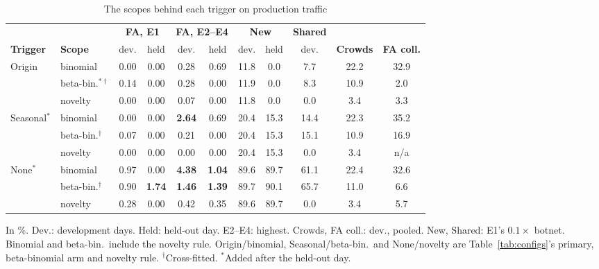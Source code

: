 \documentclass[conference,letterpaper,10pt]{IEEEtran}
\newcommand\1{\textit{(i)}}
\newcommand\2{\textit{(ii)}}
\newcommand\3{\textit{(iii)}}
\newcommand\4{\textit{(iv)}}
\newcommand\5{\textit{(v)}}
\newcommand\6{\textit{(vi)}}
\newcommand\7{\textit{(vii)}}
\newcommand\8{\textit{(viii)}}
\newcommand\9{\textit{(ix)}}
\begin{document}
\begin{table}[!ht]
\centering
\caption{The scopes behind each trigger on production traffic}
\label{tab:triggers}
\scriptsize
\setlength{\tabcolsep}{1.8pt}
\begin{tabular}{@{}llccccccccc@{}}
\toprule
 & & \multicolumn{2}{c}{\textbf{FA, E1}} & \multicolumn{2}{c}{\textbf{FA, E2--E4}} & \multicolumn{2}{c}{\textbf{New}} & \textbf{Shared} & & \\
\cmidrule(lr){3-4}\cmidrule(lr){5-6}\cmidrule(lr){7-8}\cmidrule(lr){9-9}
\textbf{Trigger} & \textbf{Scope} & dev. & held & dev. & held & dev. & held & dev. & \textbf{Crowds} & \textbf{FA coll.} \\
\midrule
Origin              & binomial               & 0.00 & 0.00 & 0.28 & 0.69 & 11.8 & 0.0  & 7.7  & 22.2 & 32.9 \\
                    & beta-bin.$^{*\dagger}$ & 0.14 & 0.00 & 0.28 & 0.00 & 11.9 & 0.0  & 8.3  & 10.9 & 2.0 \\
                    & novelty                & 0.00 & 0.00 & 0.07 & 0.00 & 11.8 & 0.0  & 0.0  & 3.4  & 3.3 \\
\rowcolor[gray]{0.90}
Seasonal$^{*}$      & binomial               & 0.00 & 0.00 & \textbf{2.64} & 0.69 & 20.4 & 15.3 & 14.4 & 22.3 & 35.2 \\
\rowcolor[gray]{0.90}
                    & beta-bin.$^{\dagger}$  & 0.07 & 0.00 & 0.21 & 0.00 & 20.4 & 15.3 & 15.1 & 10.9 & 16.9 \\
\rowcolor[gray]{0.90}
                    & novelty                & 0.00 & 0.00 & 0.00 & 0.00 & 20.4 & 15.3 & 0.0  & 3.4  & n/a \\
None$^{*}$          & binomial               & 0.97 & 0.00 & \textbf{4.38} & \textbf{1.04} & 89.6 & 89.7 & 61.1 & 22.4 & 32.6 \\
                    & beta-bin.$^{\dagger}$  & 0.90 & \textbf{1.74} & \textbf{1.46} & \textbf{1.39} & 89.7 & 90.1 & 65.7 & 11.0 & 6.6 \\
                    & novelty                & 0.28 & 0.00 & 0.42 & 0.35 & 89.6 & 89.7 & 0.0  & 3.4  & 5.7 \\
\bottomrule
\end{tabular}

\vspace{2pt}
\begin{minipage}{\linewidth}\footnotesize In \%. Dev.: development days. Held: held-out day. E2--E4: highest. Crowds, FA coll.: dev., pooled. New, Shared: E1's $0.1\times$ botnet. Binomial and beta-bin.\ include the novelty rule. Origin/binomial, Seasonal/beta-bin.\ and None/novelty are Table~\ref{tab:configs}'s primary, beta-binomial arm and novelty rule. $^{\dagger}$Cross-fitted. $^{*}$Added after the held-out day.\end{minipage}
\end{table}
\end{document}
